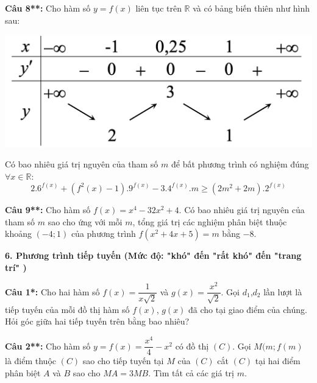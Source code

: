 \documentclass[12pt, a4paper]{article}
\begin{document}
\vspace{-0.6cm}		

		\textbf{Câu 8**: } Cho hàm số $y=f(x)$ liên tục trên $\mathbb{R}$ và có bảng biến thiên như hình sau:
		
\vspace{-0.6cm}	
	
			\begin{center}
				\includegraphics[scale=0.5]{../images/tuonggiao_cau9.png}
			\end{center}
			
\vspace{-0.6cm}
			
		Có bao nhiêu giá trị nguyên của tham số $m$ để bất phương trình có nghiệm đúng $\forall x \in \mathbb{R}$: $$2.6^{f(x)} +\left(f^2(x)-1\right).9^{f(x)} -3.4^{f(x)}.m \geq (2m^2+2m).2^{f(x)}$$ 
		
		\textbf{Câu 9**: } Cho hàm số $f(x)=x^4-32x^2+4$. Có bao nhiêu giá trị nguyên của tham số $m$ sao cho ứng với mỗi $m$, tổng giá trị các nghiệm phân biệt thuộc khoảng $(-4;1)$ của phương trình $f(x^2+4x+5)=m$ bằng $-8$.
			
\pagebreak			
			

	\textbf{6. Phương trình tiếp tuyến (Mức độ: "khó" đến "rất khó" đến "trang trí" )}
		
\vspace{-0.2cm}

		\textbf{Câu 1*: } Cho hai hàm số $f(x)=\dfrac{1}{x\sqrt{2}}$ và $g(x)=\dfrac{x^2}{\sqrt{2}}$. Gọi $d_1$,$d_2$ lần lượt là tiếp tuyến của mỗi đồ thị hàm số $f(x)$, $g(x)$ đã cho tại giao điểm của chúng. Hỏi góc giữa hai tiếp tuyến trên bằng bao nhiêu?
		
		\textbf{Câu 2**: } Cho hàm số $y=f(x)=\dfrac{x^4}{4}-x^2$ có đồ thị $(C)$. Gọi $M(m;f(m)$ là điểm thuộc $(C)$ sao cho tiếp tuyến tại $M$ của $(C)$ cắt $(C)$ tại hai điểm phân biệt $A$ và $B$ sao cho $MA=3MB$. Tìm tất cả các giá trị $m$.
		
\end{document}

